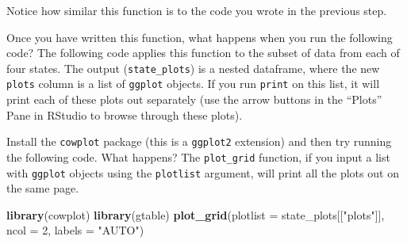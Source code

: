 \documentclass[]{book}
\makeatletter
\newenvironment{Shaded}{\begin{snugshade}}{\end{snugshade}}
\newcommand{\KeywordTok}[1]{\textcolor[rgb]{0.13,0.29,0.53}{\textbf{#1}}}
\newcommand{\DataTypeTok}[1]{\textcolor[rgb]{0.13,0.29,0.53}{#1}}
\newcommand{\DecValTok}[1]{\textcolor[rgb]{0.00,0.00,0.81}{#1}}
\newcommand{\StringTok}[1]{\textcolor[rgb]{0.31,0.60,0.02}{#1}}
\newcommand{\OperatorTok}[1]{\textcolor[rgb]{0.81,0.36,0.00}{\textbf{#1}}}
\newcommand{\NormalTok}[1]{#1}
\newenvironment{kframe}{%
\medskip{}
\setlength{\fboxsep}{.8em}
 \def\at@end@of@kframe{}%
 \ifinner\ifhmode%
  \def\at@end@of@kframe{\end{minipage}}%
  \begin{minipage}{\columnwidth}%
 \fi\fi%
 \def\FrameCommand##1{\hskip\@totalleftmargin \hskip-\fboxsep
 \colorbox{shadecolor}{##1}\hskip-\fboxsep
     \hskip-\linewidth \hskip-\@totalleftmargin \hskip\columnwidth}%
 \MakeFramed {\advance\hsize-\width
   \@totalleftmargin\z@ \linewidth\hsize
   \@setminipage}}%
 {\par\unskip\endMakeFramed%
 \at@end@of@kframe}
\renewenvironment{Shaded}{\begin{kframe}}{\end{kframe}}
\theoremstyle{definition}
\theoremstyle{definition}
\theoremstyle{definition}
\theoremstyle{remark}
\makeatother
\begin{document}
Notice how similar this function is to the code you wrote in the
previous step.

Once you have written this function, what happens when you run the
following code? The following code applies this function to the subset
of data from each of four states. The output (\texttt{state\_plots}) is
a nested dataframe, where the new \texttt{plots} column is a list of
\texttt{ggplot} objects. If you run \texttt{print} on this list, it will
print each of these plots out separately (use the arrow buttons in the
``Plots'' Pane in RStudio to browse through these plots).

\begin{Shaded}
\end{Shaded}

Install the \texttt{cowplot} package (this is a \texttt{ggplot2}
extension) and then try running the following code. What happens? The
\texttt{plot\_grid} function, if you input a list with \texttt{ggplot}
objects using the \texttt{plotlist} argument, will print all the plots
out on the same page.

\begin{Shaded}
\begin{Highlighting}[]
\KeywordTok{library}\NormalTok{(cowplot)}
\KeywordTok{library}\NormalTok{(gtable)}
\KeywordTok{plot_grid}\NormalTok{(}\DataTypeTok{plotlist =}\NormalTok{ state_plots[[}\StringTok{"plots"}\NormalTok{]], }
          \DataTypeTok{ncol =} \DecValTok{2}\NormalTok{, }\DataTypeTok{labels =} \StringTok{"AUTO"}\NormalTok{)}
\end{Highlighting}
\end{Shaded}
\end{document}
